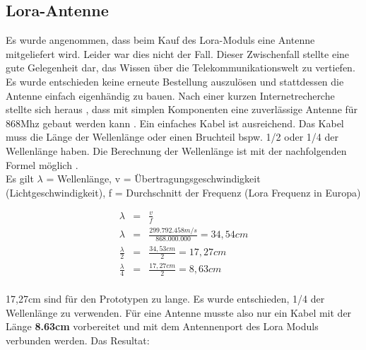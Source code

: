 \documentclass[11pt,english,german]{report}
\theoremstyle{definition}
\begin{document}
\subsection{Lora-Antenne}
Es wurde angenommen, dass beim Kauf des Lora-Moduls eine Antenne mitgeliefert wird. Leider war dies nicht der Fall. Dieser Zwischenfall stellte eine gute Gelegenheit dar, das Wissen über die Telekommunikationswelt zu vertiefen. Es wurde entschieden keine erneute Bestellung auszulösen und stattdessen  die Antenne einfach eigenhändig zu bauen. Nach einer kurzen Internetrecherche stellte sich heraus , dass mit simplen Komponenten eine zuverlässige Antenne für 868Mhz gebaut werden kann \cite{wavelengthTTN}. Ein einfaches Kabel ist ausreichend. Das Kabel muss die Länge der Wellenlänge oder einen Bruchteil bspw. 1/2 oder 1/4 der Wellenlänge haben. Die Berechnung der Wellenlänge ist mit der nachfolgenden Formel möglich \cite{wavelength}.\\[0.3cm]
Es gilt $\lambda$ = Wellenlänge, v = Übertragungsgeschwindigkeit (Lichtgeschwindigkeit), f = Durchschnitt der Frequenz (Lora Frequenz in Europa)
\begin{center}
	\begin{eqnarray*}
		\lambda &=& \frac{v}{f}\\
		\lambda &=& \frac{299.792.458 m/s}{868.000.000} = 34,54cm\\
		\frac{\lambda}{2} &=& \frac{34,53cm}{2} = 17,27cm\\
		\frac{\lambda}{4} &=& \frac{17,27cm}{2} = 8,63cm \\
	\end{eqnarray*}
\end{center}
17,27cm sind für den Prototypen zu lange. Es wurde entschieden, 1/4 der Wellenlänge zu verwenden. Für eine Antenne musste also nur ein Kabel mit der Länge \textbf{8.63cm} vorbereitet und mit dem Antennenport des Lora Moduls verbunden werden.
\newpage
Das Resultat:
\end{document}

